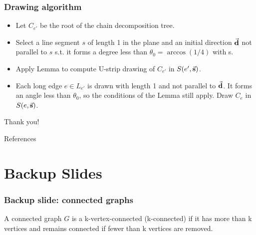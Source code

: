 \documentclass[xetex,mathserif,serif]{beamer}
\begin{document}
\begin{frame}
  \frametitle{Drawing algorithm}

  \begin{itemize}
  \item Let \(C_{e'}\) be the root of the chain decomposition tree.
  \item Select a line segment \(s\) of length 1 in the plane and an initial direction \(\vec{\bf{d}}\) not parallel to \(s\) s.t. it forms a degree less than \(\theta_0 = \arccos(1/4)\) with s.
  \item Apply Lemma to compute U-strip drawing of \(C_{e'}\) in \(S(e', \vec{\bf{s}})\).
  \item Each long edge \(e\in L_{e'}\) is drawn with length 1 and not parallel to \(\vec{\bf{d}}\). It forms an angle less than \(\theta_0\), so the conditions of the Lemma still apply. Draw \(C_{e}\) in \(S(e, \vec{\bf{s}})\).
    \end{itemize}
  \end{frame}

\begin{frame}[standout]
  Thank you!
\end{frame}

\begin{frame}[fragile]{References}
\printbibliography
\end{frame}

\appendix

\section{Backup Slides}

\begin{frame}
  \frametitle{Backup slide: connected graphs}

  \begin{definition}
    A connected graph \(G\) is a k-vertex-connected (k-connected) if it has more than k vertices and remains connected if fewer than k vertices are removed.
  \end{definition}
\end{frame}
\end{document}
